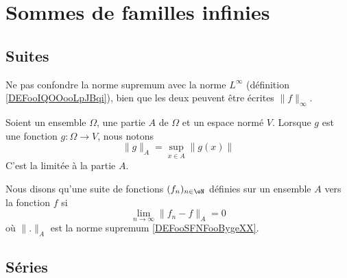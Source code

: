 \section{Sommes de familles infinies}
\label{SECooHHDXooUgLhHR}

\subsection{Suites}


Ne pas confondre la norme supremum avec la norme \( L^{\infty}\) (définition \ref{DEFooIQOOooLpJBqi}), bien que les deux peuvent être écrites \( \| f \|_{\infty}\).

\begin{definition}		\label{DEFooSFNFooBygeXX}
	Soient un ensemble \( \Omega\), une partie \( A\) de \( \Omega\) et un espace normé \( V\). Lorsque \( g\) est une fonction \( g\colon \Omega\to V\), nous notons
	\begin{equation}
		\| g \|_A=\sup_{x\in A}\| g(x) \|
	\end{equation}
	C'est la  limitée à la partie \( A\).
\end{definition}

\begin{definition}		\label{DEFooOHRYooWUsYTi}
	Nous disons qu'une suite de fonctions \( (f_n)_{n\in \eN}\) définies sur un ensemble \( A\)  vers la fonction \( f\) si
	\begin{equation}	\label{EQooGPPEooNKOtlx}
		\lim_{n\to \infty} \| f_n-f \|_A=0
	\end{equation}
	où \( \| . \|_A\) est la norme supremum \ref{DEFooSFNFooBygeXX}.
\end{definition}



\subsection{Séries}


